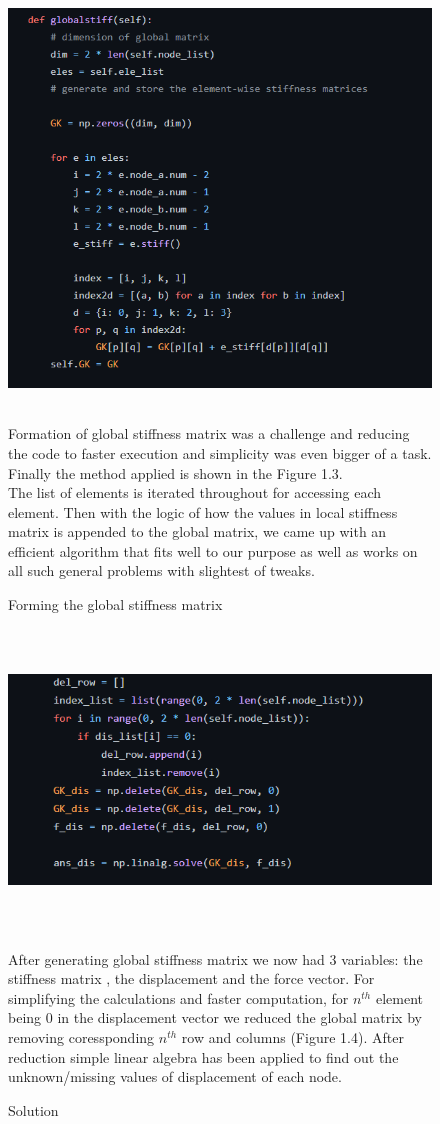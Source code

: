 \documentclass[a4paper,12pt]{report}
\begin{document}
\begin{figure}
\includegraphics[width = 14cm, height = 11cm]{gm}
\caption{Forming the global stiffness matrix}
\vspace{1cm}
Formation of global stiffness matrix was a challenge and reducing the code to faster execution and simplicity was even bigger of a task. Finally the method applied is shown in the Figure 1.3.\\

 The list of elements is iterated throughout for accessing each element. Then with the logic of how the values in local stiffness matrix is appended to the global matrix, we came up with an efficient algorithm that fits well to our purpose as well as works on all such general problems with slightest of tweaks.
\end{figure}
\begin{figure}
\includegraphics[width = 14cm, height = 8cm]{solve}
\caption{Solution}
\vspace{1cm}

After generating global stiffness matrix we now had 3 variables: the stiffness matrix , the displacement and the force vector. For simplifying the calculations and faster computation, for $n^{th}$ element being 0 in the displacement vector we reduced the global matrix by removing coressponding $n^{th}$ row and columns (Figure 1.4). After reduction simple linear algebra has been applied to find out the unknown/missing values of displacement of each node. 
\end{figure}
\end{document}
